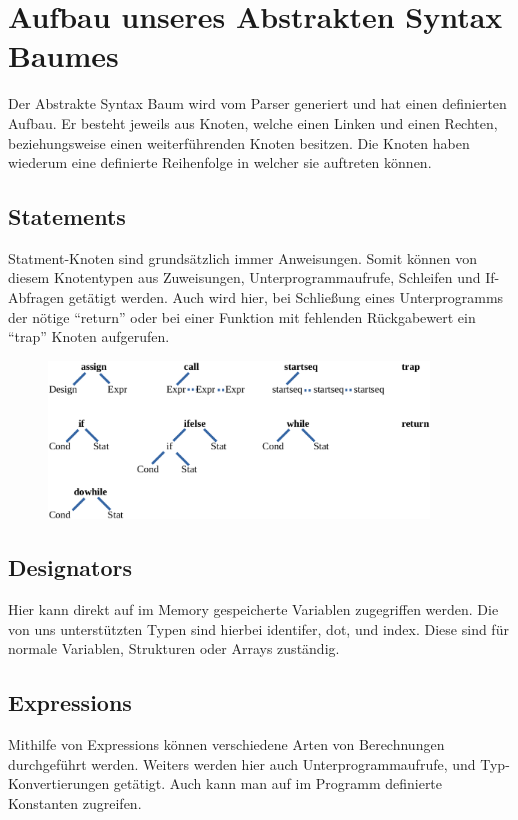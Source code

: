 \section{Aufbau unseres Abstrakten Syntax Baumes}
Der Abstrakte Syntax Baum wird vom Parser generiert und hat einen definierten Aufbau. Er besteht jeweils aus Knoten, welche einen Linken und einen Rechten, beziehungsweise einen weiterführenden Knoten besitzen. Die Knoten haben wiederum eine definierte Reihenfolge in welcher sie auftreten können. 

\subsection{Statements}
Statment-Knoten sind grundsätzlich immer Anweisungen. Somit können von diesem Knotentypen aus Zuweisungen, Unterprogrammaufrufe, Schleifen und If- Abfragen getätigt werden. Auch wird hier, bei Schließung eines Unterprogramms der nötige "`return"' oder bei einer Funktion mit fehlenden Rückgabewert ein "`trap"' Knoten aufgerufen.

\begin{figure}[h] 
  \centering
     \includegraphics[width=0.9\textwidth]{./media/images/interpreter/statements.png}
  \label{fig:Statements}
\end{figure}


\subsection{Designators}
Hier kann direkt auf im Memory gespeicherte Variablen zugegriffen werden. Die von uns unterstützten Typen sind hierbei identifer, dot, und index. Diese sind für normale Variablen, Strukturen oder Arrays zuständig.

\subsection{Expressions}
Mithilfe von Expressions können verschiedene Arten von Berechnungen durchgeführt werden. Weiters werden hier auch Unterprogrammaufrufe, und Typ-Konvertierungen getätigt. Auch kann man auf im Programm definierte Konstanten zugreifen.

